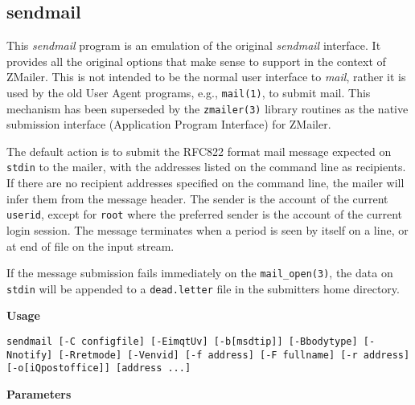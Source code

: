 \subsection{sendmail}


This {\em sendmail\/} program is an emulation of the original
{\em sendmail\/} interface. It provides all the original options
that make sense to support in the context of ZMailer.
This is not intended to be the normal user interface to
{\em mail\/}, rather it is used by the old User Agent programs, e.g.,
{\tt mail(1)}, to submit mail. This mechanism has been superseded
by the {\tt zmailer(3)} library routines as the native
submission interface (Application Program Interface) for ZMailer.

The default action is to submit the RFC822 format mail
message expected on {\tt stdin} to the mailer, with the
addresses listed on the command line as recipients. If
there are no recipient addresses specified on the command
line, the mailer will infer them from the message header.
The sender is the account of the current {\tt userid}, 
except for {\tt root} where the preferred sender is the 
account of the current login session. The message terminates 
when a period is seen by itself on a line, or at end of file on
the input stream.

If the message submission fails immediately on the
{\tt mail\_open(3)}, the data on {\tt stdin} will be 
appended to a {\tt dead.letter} file in the submitters home directory.

{\bf Usage}

{\tt sendmail [-C configfile] [-EimqtUv] [-b[msdtip]]
[-Bbodytype] [-Nnotify] [-Rretmode]
[-Venvid] [-f address] [-F fullname]
[-r address] [-o[i{\verbar}Qpostoffice]] [address ...]}

{\bf Parameters}

